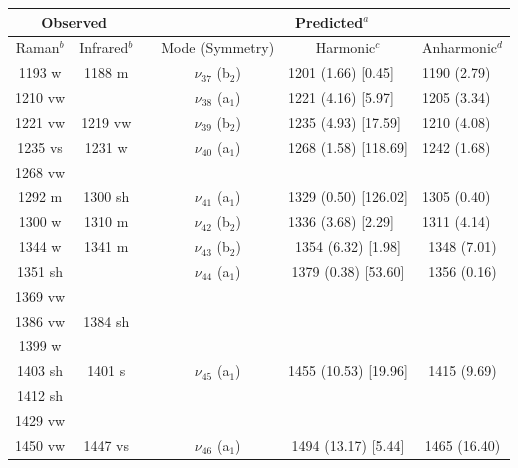  \begin{table}[H]
 	\begin{center}
 		\begin{threeparttable}
 			\begin{tabular}{c c c c c c}
 				\hline
 				\multicolumn{ 2}{c}{Observed} & \multicolumn{1}{c}{} & \multicolumn{ 3}{c}{Predicted$^{a}$} \\ \hline
 				Raman$^{b}$ & \multicolumn{1}{c}{Infrared$^{b}$} &  & \multicolumn{1}{c}{Mode (Symmetry)} & \multicolumn{1}{c}{Harmonic$^{c}$} & Anharmonic$^{d}$ \\ \hline 
 				1193 w & 1188 m & \multicolumn{1}{l}{} & $\nu_{37}$ (b$_{2}$) & \multicolumn{1}{l}{1201 (1.66) [0.45]} & \multicolumn{1}{l}{1190 (2.79)} \\ 
 				1210 vw &  & \multicolumn{1}{l}{} & $\nu_{38}$ (a$_{1}$) & \multicolumn{1}{l}{1221 (4.16) [5.97]} & \multicolumn{1}{l}{1205 (3.34)} \\ 
 				1221 vw & 1219 vw & \multicolumn{1}{l}{} & $\nu_{39}$ (b$_{2}$) & \multicolumn{1}{l}{1235 (4.93) [17.59]} & \multicolumn{1}{l}{1210 (4.08)} \\ 
 1235 vs & 1231 w & \multicolumn{1}{l}{} & $\nu_{40}$ (a$_{1}$) & \multicolumn{1}{l}{1268 (1.58) [118.69]} & \multicolumn{1}{l}{1242 (1.68)} \\ 
 1268 vw &  & \multicolumn{1}{l}{} &  & \multicolumn{1}{l}{} & \multicolumn{1}{l}{} \\ 
 1292 m & 1300 sh & \multicolumn{1}{l}{} & $\nu_{41}$ (a$_{1}$) & \multicolumn{1}{l}{1329 (0.50) [126.02]} & \multicolumn{1}{l}{1305 (0.40)} \\ 
 1300 w & 1310 m & \multicolumn{1}{l}{} & $\nu_{42}$ (b$_{2}$) & \multicolumn{1}{l}{1336 (3.68) [2.29]} & \multicolumn{1}{l}{1311 (4.14)} \\ 
1344 w & 1341 m &  & $\nu_{43}$ (b$_{2}$) & 1354 (6.32) [1.98] & 1348 (7.01) \\ 
1351 sh &  &  & $\nu_{44}$ (a$_{1}$) & 1379 (0.38) [53.60] & 1356 (0.16) \\ 
1369 vw &  &  &  &  &  \\ 
1386 vw & 1384 sh &  &  &  &  \\ 
1399 w &  &  &  &  &  \\ 
1403 sh & 1401 s &  & $\nu_{45}$ (a$_{1}$) & 1455 (10.53) [19.96] & 1415 (9.69) \\ 
1412 sh &  &  &  &  &  \\ 
1429 vw &  &  &  &   &  \\ 
1450 vw & 1447 vs &  & $\nu_{46}$ (a$_{1}$) &   1494 (13.17) [5.44] & 1465 (16.40) \\ 

\end{tabular}
\end{threeparttable}
\end{center}
\end{table}
